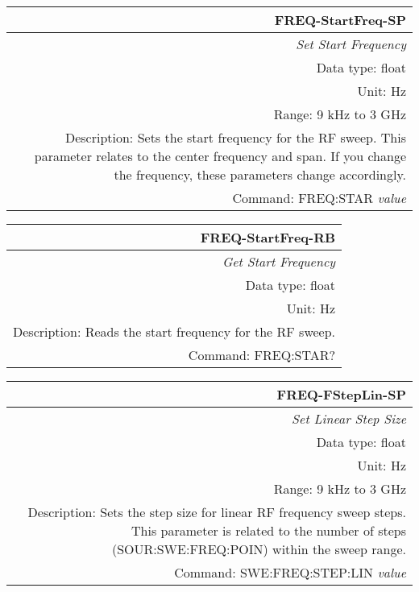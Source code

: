 \documentclass[openany]{article}
\begin{document}
	\paragraph{}

		\begin{tabular}{N}
			\hline
			\bfseries FREQ-StartFreq-SP \\ \hline
			\emph{Set Start Frequency} \\
			Data type: float \\
			Unit: Hz \\
			Range: 9 kHz to 3 GHz \\
			Description: Sets the start frequency for the RF sweep. This parameter relates to the center frequency and span. If you change the frequency, these parameters change accordingly. \\
			Command: FREQ:STAR \emph{value} \\
			
		\end{tabular}


		\begin{tabular}{N}
			\hline
			\bfseries FREQ-StartFreq-RB \\ \hline
			\emph{Get Start Frequency} \\
			Data type: float \\
			Unit: Hz \\
			Description: Reads the start frequency for the RF sweep. \\
			Command: FREQ:STAR? \\

		\end{tabular}
%
		\begin{tabular}{N}
			\hline
			\bfseries FREQ-FStepLin-SP \\ \hline
			\emph{Set Linear Step Size} \\
			Data type: float \\
			Unit: Hz \\
			Range: 9 kHz to 3 GHz \\
			Description: Sets the step size for linear RF frequency sweep steps. This parameter is related to the number of steps (SOUR:SWE:FREQ:POIN) within the sweep range. \\
			Command: SWE:FREQ:STEP:LIN \emph{value} \\
			
		\end{tabular}
\end{document}
